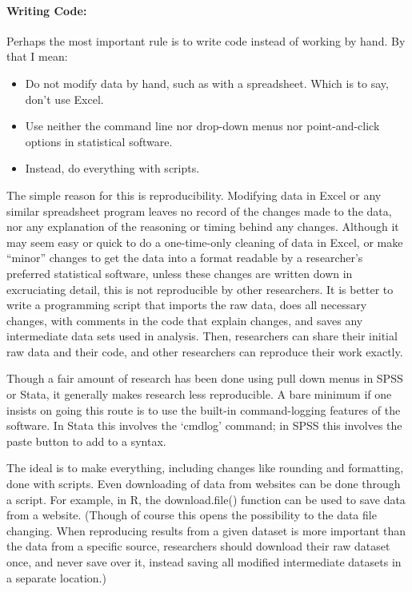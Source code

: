 \documentclass[12pt] {article}
\begin{document}
\paragraph{Writing Code:}
Perhaps the most important rule is to write code instead of working by hand. By
that I mean:

\begin{itemize}
\item
  Do not modify data by hand, such as with a spreadsheet. Which is to
  say, don't use Excel.
\item
  Use neither the command line nor drop-down menus nor point-and-click
  options in statistical software.
\item
  Instead, do everything with scripts.
\end{itemize}

The simple reason for this is reproducibility. Modifying data in Excel
or any similar spreadsheet program leaves no record of the changes made
to the data, nor any explanation of the reasoning or timing behind any
changes. Although it may seem easy or quick to do a one-time-only
cleaning of data in Excel, or make ``minor'' changes to get the data
into a format readable by a researcher's preferred statistical software,
unless these changes are written down in excruciating detail, this is
not reproducible by other researchers. It is better to write a programming
script that imports the raw data, does all necessary changes, with
comments in the code that explain changes, and saves any intermediate
data sets used in analysis. Then, researchers can share their initial
raw data and their code, and other researchers can reproduce their work
exactly.

Though a fair amount of research has been done using
pull down menus in SPSS or Stata, it generally makes research less reproducible. A bare minimum
if one insists on going this route is to use the built-in
command-logging features of the software. In Stata this involves the
`cmdlog' command; in SPSS this involves the paste button to add to a
syntax.

The ideal is to make everything, including changes like rounding and
formatting, done with scripts. Even downloading of data from websites
can be done through a script. For example, in R, the download.file()
function can be used to save data from a website. (Though of course this
opens the possibility to the data file changing. When reproducing
results from a given dataset is more important than the data from a
specific source, researchers should download their raw dataset once, and
never save over it, instead saving all modified intermediate datasets in
a separate location.) 
\end{document}
